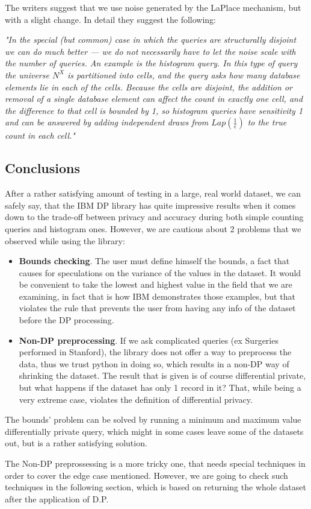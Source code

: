 The writers suggest that we use noise generated by the LaPlace mechanism, but with a slight change. In detail they suggest the following:

\textit{"In the special (but common) case in which the queries are structurally disjoint we can do much better — we do not necessarily have to let the noise scale with the number of queries. An example is the histogram query. In this type of query the universe $N^X$ is partitioned into cells, and the query asks how many database elements lie in each of the cells. Because the cells are disjoint, the addition or removal of a single database element can affect the count in exactly one cell, and the difference to that cell is bounded by 1, so histogram queries have sensitivity 1 and can be answered by adding independent draws from $Lap(\frac{1}{\epsilon})$ to the true count in each cell."}


\subsection{Conclusions}

After a rather satisfying amount of testing in a large, real world dataset, we can safely say, that the IBM DP library has quite impressive results when it comes down to the trade-off between privacy and accuracy during both simple counting queries and histogram ones. However, we are cautious about 2 problems that we observed while using the library:

\begin{itemize}
 \item \textbf{Bounds checking}. The user must define himself the bounds, a fact that causes for speculations on the variance of the values in the dataset. It would be convenient to take the lowest and highest value in the field that we are examining, in fact that is how IBM demonstrates those examples, but that violates the rule that prevents the user from having any info of the dataset before the DP processing.
 
 \item \textbf{Non-DP preprocessing}. If we ask complicated queries (ex Surgeries performed in Stanford), the library does not offer a way to preprocess the data, thus we trust python in doing so, which results in a non-DP way of shrinking the dataset. The result that is given is of course differential private, but what happens if the dataset has only 1 record in it? That, while being a very extreme case, violates the definition of differential privacy.
\end{itemize}

The bounds' problem can be solved by running a minimum and maximum value differentially private query, which might in some cases leave some of the datasets out, but is a rather satisfying solution. 

The Non-DP preprossessing is a more tricky one, that needs special techniques in order to cover the edge case mentioned. However, we are going to check such techniques in the following section, which is based on returning the whole dataset after the application of D.P.